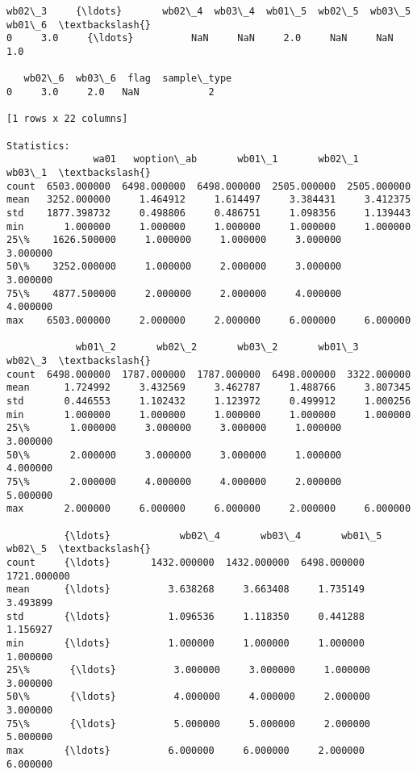 \documentclass[11pt]{article}
\begin{document}
\begin{Verbatim}[commandchars=\\\{\}]
   wb02\_3     {\ldots}       wb02\_4  wb03\_4  wb01\_5  wb02\_5  wb03\_5  wb01\_6  \textbackslash{}
0     3.0     {\ldots}          NaN     NaN     2.0     NaN     NaN     1.0   

   wb02\_6  wb03\_6  flag  sample\_type  
0     3.0     2.0   NaN            2  

[1 rows x 22 columns]

Statistics: 
               wa01   woption\_ab       wb01\_1       wb02\_1       wb03\_1  \textbackslash{}
count  6503.000000  6498.000000  6498.000000  2505.000000  2505.000000   
mean   3252.000000     1.464912     1.614497     3.384431     3.412375   
std    1877.398732     0.498806     0.486751     1.098356     1.139443   
min       1.000000     1.000000     1.000000     1.000000     1.000000   
25\%    1626.500000     1.000000     1.000000     3.000000     3.000000   
50\%    3252.000000     1.000000     2.000000     3.000000     3.000000   
75\%    4877.500000     2.000000     2.000000     4.000000     4.000000   
max    6503.000000     2.000000     2.000000     6.000000     6.000000   

            wb01\_2       wb02\_2       wb03\_2       wb01\_3       wb02\_3  \textbackslash{}
count  6498.000000  1787.000000  1787.000000  6498.000000  3322.000000   
mean      1.724992     3.432569     3.462787     1.488766     3.807345   
std       0.446553     1.102432     1.123972     0.499912     1.000256   
min       1.000000     1.000000     1.000000     1.000000     1.000000   
25\%       1.000000     3.000000     3.000000     1.000000     3.000000   
50\%       2.000000     3.000000     3.000000     1.000000     4.000000   
75\%       2.000000     4.000000     4.000000     2.000000     5.000000   
max       2.000000     6.000000     6.000000     2.000000     6.000000   

          {\ldots}            wb02\_4       wb03\_4       wb01\_5       wb02\_5  \textbackslash{}
count     {\ldots}       1432.000000  1432.000000  6498.000000  1721.000000   
mean      {\ldots}          3.638268     3.663408     1.735149     3.493899   
std       {\ldots}          1.096536     1.118350     0.441288     1.156927   
min       {\ldots}          1.000000     1.000000     1.000000     1.000000   
25\%       {\ldots}          3.000000     3.000000     1.000000     3.000000   
50\%       {\ldots}          4.000000     4.000000     2.000000     3.000000   
75\%       {\ldots}          5.000000     5.000000     2.000000     5.000000   
max       {\ldots}          6.000000     6.000000     2.000000     6.000000   


\end{Verbatim}
\end{document}
